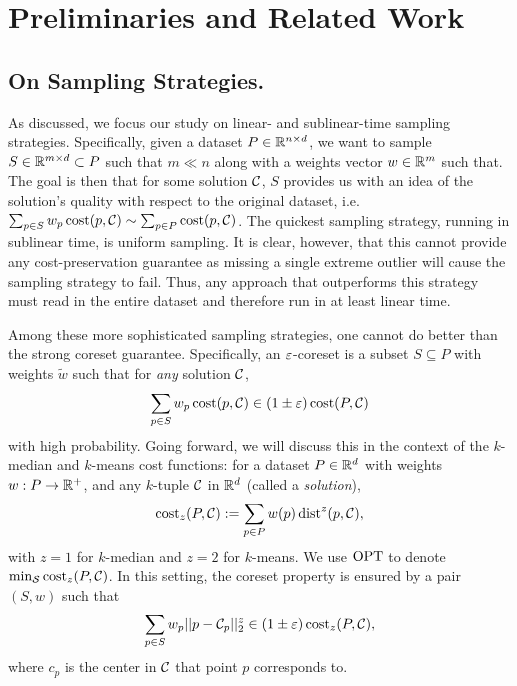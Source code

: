 \section{Preliminaries and Related Work}

\subsection{On Sampling Strategies.}
\label{ssec:sens_sampling}

As discussed, we focus our study on linear- and sublinear-time sampling strategies. Specifically, given a dataset $P \in \mathbb{R}^{n \times d}$, we want to sample $S
\in \mathbb{R}^{m \times d} \subset P$ such that $m \ll n$ along with a weights vector $w \in \mathbb{R}^m$ such that. The goal is then that for some solution $\mathcal C$, $S$
provides us with an idea of the solution's quality with respect to the original dataset, i.e. $\sum_{p \in S} w_p \operatorname{cost}(p, \mathcal C) \sim \sum_{p \in P} \operatorname{cost}(p,
\mathcal C)$. 
The quickest sampling strategy, running in sublinear time, is uniform sampling. It is clear, however, that this cannot provide any cost-preservation guarantee
as missing a single extreme outlier will cause the sampling strategy to fail. Thus, any approach that outperforms this strategy must read in the entire dataset
and therefore run in at least linear time. 

Among these more sophisticated sampling strategies, one cannot do better than the strong coreset guarantee. Specifically, an $\varepsilon$-coreset is a subset $S
\subseteq P$ with weights $\tilde w$ such that for \emph{any} solution $\mathcal C$, \[\sum_{p \in S} w_p \operatorname{cost}(p, \mathcal C) \in (1 \pm \varepsilon) \operatorname{cost}(P, \mathcal C)\] with
high probability.  Going forward, we will discuss this in the context of the $k$-median and $k$-means cost functions: for a dataset $P \in \mathbb{R}^d$ with weights $w
: P \rightarrow \mathbb{R}^+$, and any $k$-tuple $\mathcal C$ in $\mathbb{R}^d$ (called a \emph{solution}), \[\operatorname{cost}_z(P, \mathcal C) := \sum_{p \in P} w(p) \operatorname{dist}^z(p, \mathcal C),\] with
$z=1$ for $k$-median and $z=2$ for $k$-means. We use $\text{OPT}$ to denote $\min_{\mathcal S} \operatorname{cost}_z(P, \mathcal C)$. In this setting, the coreset property is ensured by
a pair $(S, w)$ such that \[\sum_{p \in S} w_p ||p - \mathcal C_p||_2^z \in (1 \pm \varepsilon) \operatorname{cost}_z(P, \mathcal C),\] where $c_p$ is the center in $\mathcal C$ that point $p$
corresponds to.

